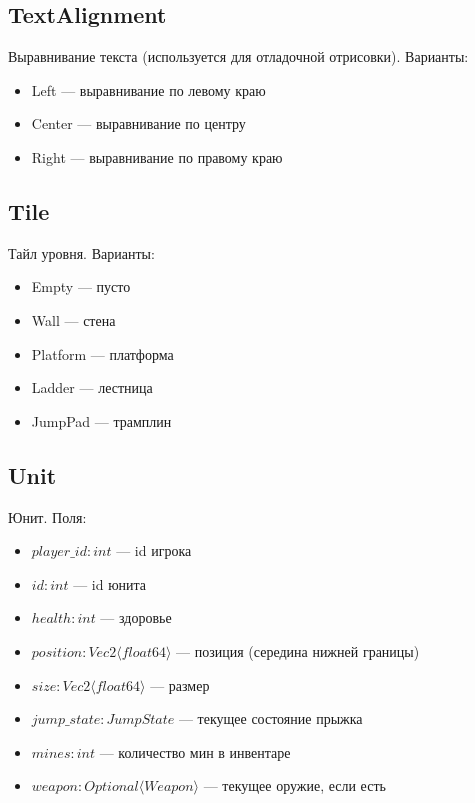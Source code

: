 \subsection{TextAlignment}
Выравнивание текста (используется для отладочной отрисовки). Варианты:
\begin{itemize}
    \item Left --- выравнивание по левому краю
    \item Center --- выравнивание по центру
    \item Right --- выравнивание по правому краю
\end{itemize}

\subsection{Tile}
Тайл уровня. Варианты:
\begin{itemize}
    \item Empty --- пусто
    \item Wall --- стена
    \item Platform --- платформа
    \item Ladder --- лестница
    \item JumpPad --- трамплин
\end{itemize}

\subsection{Unit}
Юнит. Поля:
\begin{itemize}
    \item $player\_id : int$ --- id игрока
    \item $id : int$ --- id юнита
    \item $health : int$ --- здоровье
    \item $position : Vec2 \langle float64 \rangle$ --- позиция (середина нижней границы)
    \item $size : Vec2 \langle float64 \rangle$ --- размер
    \item $jump\_state : JumpState$ --- текущее состояние прыжка
    \item $mines : int$ --- количество мин в инвентаре
    \item $weapon : Optional \langle Weapon \rangle$ --- текущее оружие, если есть
\end{itemize}

